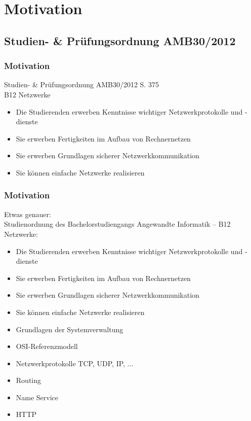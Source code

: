 \documentclass[xcolor=dvipsnames,aspectratio=169]{beamer}
\begin{document}
\section{Motivation}
\subsection{Studien- \& Prüfungsordnung AMB30/2012}
\begin{frame}
	\frametitle{Motivation}
	Studien- \& Prüfungsordnung AMB30/2012 S. 375\\
	B12 Netzwerke
	\begin{itemize}
		\item Die Studierenden erwerben Kenntnisse wichtiger Netzwerkprotokolle und -dienste
		\item Sie erwerben Fertigkeiten im Aufbau von Rechnernetzen
		\item Sie erwerben Grundlagen sicherer Netzwerkkommunikation
		\item Sie können einfache Netzwerke realisieren
	\end{itemize}
\end{frame}
\begin{frame}
	\frametitle{Motivation}
	\vspace{-0.7cm}
	Etwas genauer:\\
	Studienordnung des Bachelorstudiengangs Angewandte Informatik -- B12 Netzwerke:
	\begin{itemize}
		\item Die Studierenden erwerben Kenntnisse wichtiger Netzwerkprotokolle und -dienste
		\item Sie erwerben Fertigkeiten im Aufbau von Rechnernetzen
		\item Sie erwerben Grundlagen sicherer Netzwerkkommunikation
		\item Sie können einfache Netzwerke realisieren
		\item Grundlagen der Systemverwaltung
		\item OSI-Referenzmodell
		\item Netzwerkprotokolle TCP, UDP, IP, ...
		\item Routing
		\item Name Service
		\item HTTP
	\end{itemize}
\end{frame}
\end{document}
